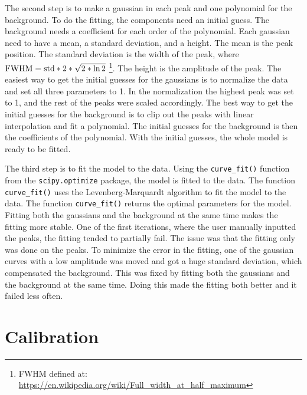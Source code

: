 The second step is to make a gaussian in each peak and one polynomial for the background.
To do the fitting, the components need an initial guess.
The background needs a coefficient for each order of the polynomial.
Each gaussian need to have a mean, a standard deviation, and a height.
The mean is the peak position.
The standard deviation is the width of the peak, where $\textnormal{FWHM} = \textnormal{std}*2*\sqrt{2*\ln{2}}$ \footnote{FWHM defined at: \url{https://en.wikipedia.org/wiki/Full_width_at_half_maximum}}.
The height is the amplitude of the peak.
The easiest way to get the initial guesses for the gaussians is to normalize the data and set all three parameters to 1.
In the normalization the highest peak was set to 1, and the rest of the peaks were scaled accordingly.
The best way to get the initial guesses for the background is to clip out the peaks with linear interpolation and fit a polynomial.
The initial guesses for the background is then the coefficients of the polynomial.
With the initial guesses, the whole model is ready to be fitted.

The third step is to fit the model to the data.
Using the \verb|curve_fit()| function from the \verb|scipy.optimize| package, the model is fitted to the data.
The function \verb|curve_fit()| uses the Levenberg-Marquardt algorithm to fit the model to the data.
The function \verb|curve_fit()| returns the optimal parameters for the model.
Fitting both the gaussians and the background at the same time makes the fitting more stable.
One of the first iterations, where the user manually inputted the peaks, the fitting tended to partially fail.
The issue was that the fitting only was done on the peaks.
To minimize the error in the fitting, one of the gaussian curves with a low amplitude was moved and got a huge standard deviation, which compensated the background.
This was fixed by fitting both the gaussians and the background at the same time.
Doing this made the fitting both better and it failed less often.

%
%
\section{Calibration}
\label{sec:results:calibration}

